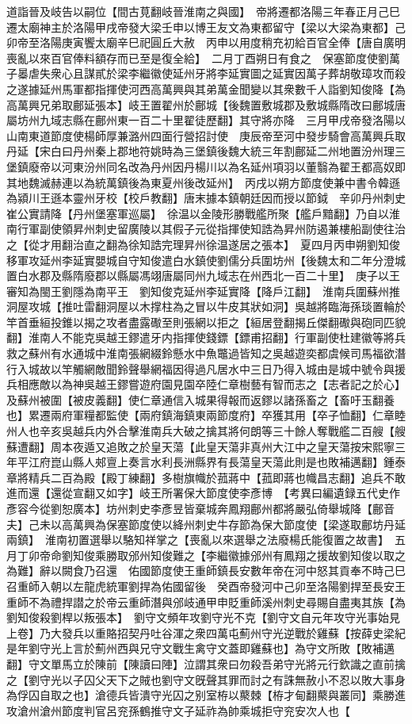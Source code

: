 道詣晉及岐告以嗣位【間古莧翻岐晉淮南之與國】　帝將遷都洛陽三年春正月己巳遷太廟神主於洛陽甲戌帝發大梁壬申以博王友文為東都留守【梁以大梁為東都】己卯帝至洛陽庚寅饗太廟辛巳祀圓丘大赦　丙申以用度稍充初給百官全俸【唐自廣明喪亂以來百官俸料額存而已至是復全給】　二月丁酉朔日有食之　保塞節度使劉萬子㬥虐失衆心且謀貳於梁李繼徽使延州牙將李延實圖之延實因萬子葬胡敬璋攻而殺之遂據延州馬軍都指揮使河西高萬興與其弟萬金聞變以其衆數千人詣劉知俊降【為高萬興兄弟取鄜延張本】岐王置翟州於鄜城【後魏置敷城郡及敷城縣隋改曰鄜城唐屬坊州九域志縣在鄜州東一百二十里翟徒歷翻】其守將亦降　三月甲戌帝發洛陽以山南東道節度使楊師厚兼潞州四面行營招討使　庚辰帝至河中發步騎會高萬興兵取丹延【宋白曰丹州秦上郡地符姚時為三堡鎮後魏大統三年割鄜延二州地置汾州理三堡鎮廢帝以河東汾州同名改為丹州因丹楊川以為名延州項羽以董翳為翟王都高奴即其地魏滅赫連以為統萬鎮後為東夏州後改延州】　丙戌以朔方節度使兼中書令韓遜為潁川王遜本靈州牙校【校戶教翻】唐末據本鎮朝廷因而授以節鉞　辛卯丹州刺史崔公實請降【丹州堡塞軍巡屬】　徐温以金陵形勝戰艦所聚【艦戶黯翻】乃自以淮南行軍副使領昇州刺史留廣陵以其假子元從指揮使知誥為昇州防遏兼樓船副使往治之【從才用翻治直之翻為徐知誥完理昇州徐温遂居之張本】　夏四月丙申朔劉知俊移軍攻延州李延實嬰城自守知俊遣白水鎮使劉儒分兵圍坊州【後魏太和二年分澄城置白水郡及縣隋廢郡以縣屬馮翊唐屬同州九域志在州西北一百二十里】　庚子以王審知為閩王劉隱為南平王　劉知俊克延州李延實降【降戶江翻】　淮南兵圍蘇州推洞屋攻城【推吐雷翻洞屋以木撑柱為之冒以牛皮其狀如洞】吳越將臨海孫琰置輪於竿首垂絙投錐以揭之攻者盡露礮至則張網以拒之【絙居登翻揭丘傑翻礮與砲同匹貌翻】淮南人不能克吳越王鏐遣牙内指揮使錢鏢【鏢甫招翻】行軍副使杜建徽等將兵救之蘇州有水通城中淮南張網綴鈴懸水中魚鼈過皆知之吳越遊奕都虞候司馬福欲潛行入城故以竿觸網敵聞鈴聲舉網福因得過凡居水中三日乃得入城由是城中號令與援兵相應敵以為神吳越王鏐嘗遊府園見園卒陸仁章樹藝有智而志之【志者記之於心】及蘇州被圍【被皮義翻】使仁章通信入城果得報而返鏐以諸孫畜之【畜吁玉翻養也】累遷兩府軍糧都監使【兩府鎮海鎮東兩節度府】卒獲其用【卒子恤翻】仁章睦州人也辛亥吳越兵内外合擊淮南兵大破之擒其將何朗等三十餘人奪戰艦二百艘【艘蘇遭翻】周本夜遁又追敗之於皇天蕩【此皇天蕩非真州大江中之皇天蕩按宋熙寧三年平江府崑山縣人郟亶上奏言水利長洲縣界有長蕩皇天蕩此則是也敗補邁翻】鍾泰章將精兵二百為殿【殿丁練翻】多樹旗幟於菰蔣中【菰即蔣也幟昌志翻】追兵不敢進而還【還從宣翻又如字】岐王所署保大節度使李彥博　【考異曰編遺録五代史作彥容今從劉恕廣本】坊州刺史李彥昱皆棄城奔鳳翔鄜州都將嚴弘倚舉城降【鄜音夫】己未以高萬興為保塞節度使以絳州刺史牛存節為保大節度使【梁遂取鄜坊丹延兩鎮】　淮南初置選舉以駱知祥掌之【喪亂以來選舉之法廢楊氏能復置之故書】　五月丁卯帝命劉知俊乘勝取邠州知俊難之【李繼徽據邠州有鳳翔之援故劉知俊以取之為難】辭以闕食乃召還　佑國節度使王重師鎮長安數年帝在河中怒其貢奉不時己巳召重師入朝以左龍虎統軍劉捍為佑國留後　癸酉帝發河中己卯至洛陽劉捍至長安王重師不為禮捍譛之於帝云重師潛與邠岐通甲申貶重師溪州刺史尋賜自盡夷其族【為劉知俊殺劉桿以叛張本】　劉守文頻年攻劉守光不克【劉守文自元年攻守光事始見上卷】乃大發兵以重賂招契丹吐谷渾之衆四萬屯薊州守光逆戰於雞蘇【按薛史梁紀是年劉守光上言於薊州西與兄守文戰生禽守文蓋即雞蘇也】為守文所敗【敗補邁翻】守文單馬立於陳前【陳讀曰陣】泣謂其衆曰勿殺吾弟守光將元行欽識之直前擒之【劉守光以子囚父天下之賊也劉守文旣聲其罪而討之有誅無赦小不忍以敗大事身為俘囚自取之也】滄德兵皆潰守光囚之别室栫以藂棘【栫才甸翻藂與叢同】乘勝進攻滄州滄州節度判官呂兖孫鶴推守文子延祚為帥乘城拒守兖安次人也【